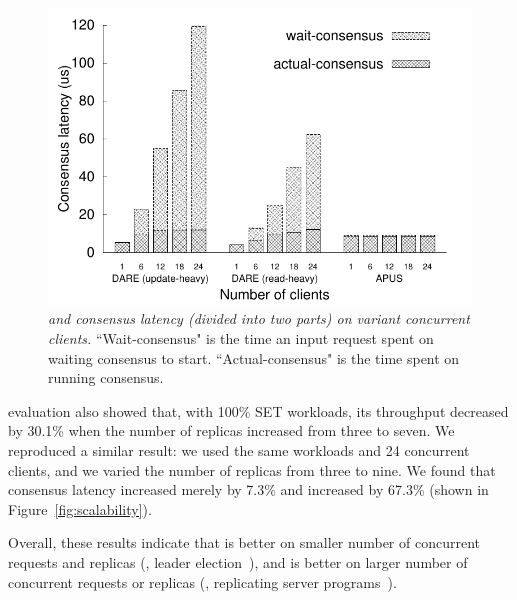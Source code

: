 \begin{figure}[h]
\centering
\vspace{-.2in}
\includegraphics[width=.4\textwidth]{figures/server-processing-compare}
\vspace{-.1in}
\caption{{\em \xxx and \dare consensus latency (divided into two parts) on 
variant concurrent clients.} 
``Wait-consensus" is the time an input request spent on waiting consensus to 
start. ``Actual-consensus" is the time spent on running consensus.}
\label{fig:compare}
\vspace{-.1in}
\end{figure}

\dare evaluation also showed that, with 100\% SET workloads, its throughput 
decreased by 30.1\% when the number of replicas increased from three to seven. 
We reproduced a similar result: we used the same workloads and 24 concurrent 
clients, and we varied the number of replicas from three to nine. We found 
that \xxx consensus latency increased merely by 7.3\% and \dare increased by 
67.3\% (shown in Figure~\ref{fig:scalability}).

Overall, these results indicate that \dare is better on smaller number of 
concurrent requests and replicas (\eg, 
leader election~\cite{chubby:osdi,zookeeper}), and \xxx is better on larger 
number of concurrent requests or replicas (\eg, replicating server 
programs~\cite{rex:eurosys14,crane:sosp15}).


